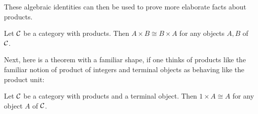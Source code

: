These algebraic identities can then be used to prove more elaborate facts about products.

\begin{proposition} \label{prop:products-commutative}
  Let \(\mathcal C\) be a category with products.
  Then \(A\times B \cong B \times A\)
  for any objects \(A,B\) of \(\mathcal C\).
\end{proposition}

Next, here is a theorem with a familiar shape, if one thinks of
products like the familiar notion of product of integers and terminal
objects as behaving like the product unit:

\begin{proposition}
  Let \(\mathcal C\) be a category with products and a terminal object.
  Then \(1 \times A \cong A\) for any object \(A\) of \(\mathcal C\).
\end{proposition}
